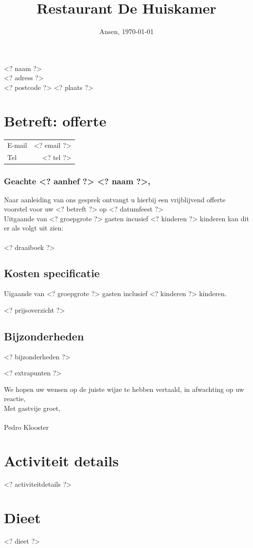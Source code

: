 \documentclass{scrartcl}
\begin{document}

\title{Restaurant De Huiskamer}
\date{Ansen, \today}
\maketitle
\thispagestyle{empty}

\begin{flushright}
	<? naam ?> \\
	<? adress ?> \\
	<? postcode ?> <? plaats ?>
\end{flushright}
\section{Betreft: offerte}
\begin{tabular}{l r}
  E-mail & <? email ?>  \\
  Tel & <? tel ?>  \\
\end{tabular}

\subsubsection*{Geachte <? aanhef ?> <? naam ?>,}

Naar aanleiding van ons gesprek ontvangt u hierbij een vrijblijvend offerte voorstel
voor uw <? betreft ?> op <? datumfeest ?> \\

Uitgaande van <? groepgrote ?> gasten incusief <? kinderen ?> kinderen kan dit er als volgt uit zien: \\\\
<? draaiboek ?>

\newpage

\subsection*{Kosten specificatie}
Uigaande van <? groepgrote ?> gasten inclusief <? kinderen ?> kinderen.

<? prijsoverzicht ?>

\subsection*{Bijzonderheden}

<? bijzonderheden ?>

<? extrapunten ?>

We hopen uw wensen op de juiste wijze te hebben vertaald, in afwachting op uw reactie, \\

Met gastvije groet, \\\\

Pedro Klooster

\newpage

\section{Activiteit details}

<? activiteitdetails ?>

\section{Dieet}

<? dieet ?>
\end{document}
